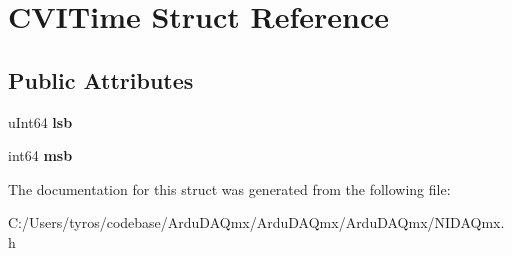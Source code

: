 \hypertarget{struct_c_v_i_time}{}\section{C\+V\+I\+Time Struct Reference}
\label{struct_c_v_i_time}
\subsection*{Public Attributes}
\begin{DoxyCompactItemize}
\item 
\mbox{\label{struct_c_v_i_time_a014b16b9f7aa8003e8731b411fdc6e57}} 
u\+Int64 {\bfseries lsb}
\item 
\mbox{\label{struct_c_v_i_time_af7073a43f79ab7552ea4881e3f317a4a}} 
int64 {\bfseries msb}
\end{DoxyCompactItemize}


The documentation for this struct was generated from the following file\+:\begin{DoxyCompactItemize}
\item 
C\+:/\+Users/tyros/codebase/\+Ardu\+D\+A\+Qmx/\+Ardu\+D\+A\+Qmx/\+Ardu\+D\+A\+Qmx/N\+I\+D\+A\+Qmx.\+h\end{DoxyCompactItemize}
